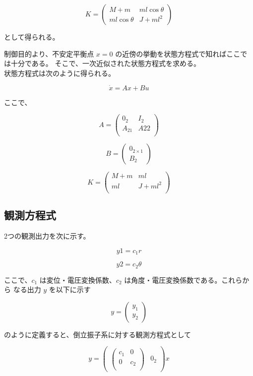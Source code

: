 \documentclass[10pt,a4paper,titlepage]{jreport} %
\begin{document}
\begin{equation}
K = 
\begin{pmatrix}
M+m & ml\cos\theta \\
ml\cos\theta & J + ml^2
\end{pmatrix}
\end{equation}

として得られる。

制御目的より、不安定平衡点 $x = 0$ の近傍の挙動を状態方程式で知ればここでは十分である。
そこで、一次近似された状態方程式を求める。\\

状態方程式は次のように得られる。

\begin{equation}
\dot{x} = Ax + Bu
\end{equation}

ここで、

\[
A =
\begin{pmatrix}
0_2 & I_2 \\
A_21 & A22 \\
\end{pmatrix}
\]

\[
B =
\begin{pmatrix}
0_{2\times1} \\
B_2
\end{pmatrix}
\]

\[
K =
\begin{pmatrix}
M + m & ml \\
ml & J + ml^2 \\
\end{pmatrix}
\]

\subsection{観測方程式}

2つの観測出力を次に示す。

\[
y1 = c_1r
\]

\[
y2 = c_2\theta
\]

ここで、$c_1$ は変位・電圧変換係数、$c_2$ は角度・電圧変換係数である。これらから
なる出力 $y$ を以下に示す

\[
y = 
\begin{pmatrix}
y_1 \\
y_2
\end{pmatrix}
\]

のように定義すると、倒立振子系に対する観測方程式として

\begin{equation}
y = 
\begin{pmatrix}
\begin{pmatrix}
c_1 & 0 \\
0 & c_2 \\
\end{pmatrix} &
0_2
\end{pmatrix}
x
\end{equation}
\end{document}
